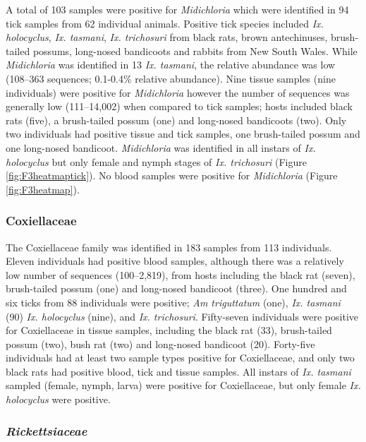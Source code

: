\documentclass[a4paper, nobind]{templates/ociamthesis}
\begin{document}
A total of 103 samples were positive for \emph{Midichloria} which were identified in 94 tick samples from 62 individual animals.
Positive tick species included \emph{Ix. holocyclus}, \emph{Ix. tasmani}, \emph{Ix. trichosuri} from black rats, brown antechinuses, brush-tailed possums, long-nosed bandicoots and rabbits from New South Wales.
While \emph{Midichloria} was identified in 13 \emph{Ix. tasmani}, the relative abundance was low (108--363 sequences; 0.1-0.4\% relative abundance).
Nine tissue samples (nine individuals) were positive for \emph{Midichloria} however the number of sequences was generally low (111--14,002) when compared to tick samples; hosts included black rats (five), a brush-tailed possum (one) and long-nosed bandicoots (two).
Only two individuals had positive tissue and tick samples, one brush-tailed possum and one long-nosed bandicoot.
\emph{Midichloria} was identified in all instars of \emph{Ix. holocyclus} but only female and nymph stages of \emph{Ix. trichosuri} (Figure \ref{fig:F3heatmaptick}).
No blood samples were positive for \emph{Midichloria} (Figure \ref{fig:F3heatmap}).

\hypertarget{coxiellaceae}{%
\subsubsection{Coxiellaceae}\label{coxiellaceae}}

The Coxiellaceae family was identified in 183 samples from 113 individuals. Eleven individuals had positive blood samples, although there was a relatively low number of sequences (100--2,819), from hosts including the black rat (seven), brush-tailed possum (one) and long-nosed bandicoot (three).
One hundred and six ticks from 88 individuals were positive; \emph{Am triguttatum} (one), \emph{Ix. tasmani} (90) \emph{Ix. holocyclus} (nine), and \emph{Ix. trichosuri}.
Fifty-seven individuals were positive for Coxiellaceae in tissue samples, including the black rat (33), brush-tailed possum (two), bush rat (two) and long-nosed bandicoot (20).
Forty-five individuals had at least two sample types positive for Coxiellaceae, and only two black rats had positive blood, tick and tissue samples.
All instars of \emph{Ix. tasmani} sampled (female, nymph, larva) were positive for Coxiellaceae, but only female \emph{Ix. holocyclus} were positive.

\hypertarget{rickettsiaceae}{%
\subsubsection{\texorpdfstring{\emph{Rickettsiaceae}}{Rickettsiaceae}}\label{rickettsiaceae}}
\end{document}
